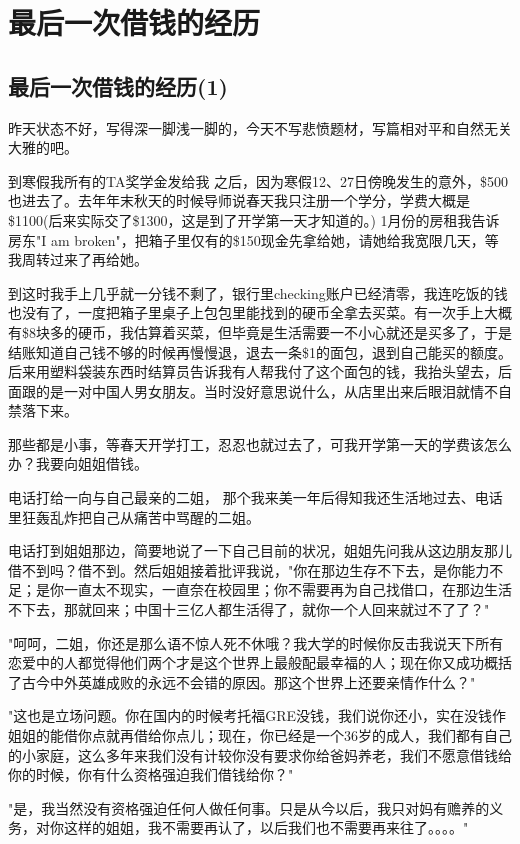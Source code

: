 \documentclass[12pt]{book}
\begin{document}
\chapter{最后一次借钱的经历}
\label{sec-33}
\section{最后一次借钱的经历(1)}
\label{sec-33-1}
昨天状态不好，写得深一脚浅一脚的，今天不写悲愤题材，写篇相对平和自然无关大雅的吧。

到寒假我所有的TA奖学金发给我 之后，因为寒假12、27日傍晚发生的意外，\$500也进去了。去年年末秋天的时候导师说春天我只注册一个学分，学费大概是\$1100(后来实际交了\$1300，这是到了开学第一天才知道的。) 1月份的房租我告诉房东"I am broken"，把箱子里仅有的\$150现金先拿给她，请她给我宽限几天，等我周转过来了再给她。

到这时我手上几乎就一分钱不剩了，银行里checking账户已经清零，我连吃饭的钱也没有了，一度把箱子里桌子上包包里能找到的硬币全拿去买菜。有一次手上大概有\$8块多的硬币，我估算着买菜，但毕竟是生活需要一不小心就还是买多了，于是结账知道自己钱不够的时候再慢慢退，退去一条\$1的面包，退到自己能买的额度。后来用塑料袋装东西时结算员告诉我有人帮我付了这个面包的钱，我抬头望去，后面跟的是一对中国人男女朋友。当时没好意思说什么，从店里出来后眼泪就情不自禁落下来。

那些都是小事，等春天开学打工，忍忍也就过去了，可我开学第一天的学费该怎么办？我要向姐姐借钱。

电话打给一向与自己最亲的二姐， 那个我来美一年后得知我还生活地过去、电话里狂轰乱炸把自己从痛苦中骂醒的二姐。

电话打到姐姐那边，简要地说了一下自己目前的状况，姐姐先问我从这边朋友那儿借不到吗？借不到。然后姐姐接着批评我说，"你在那边生存不下去，是你能力不足；是你一直太不现实，一直奈在校园里；你不需要再为自己找借口，在那边生活不下去，那就回来；中国十三亿人都生活得了，就你一个人回来就过不了了？"

"呵呵，二姐，你还是那么语不惊人死不休哦？我大学的时候你反击我说天下所有恋爱中的人都觉得他们两个才是这个世界上最般配最幸福的人；现在你又成功概括了古今中外英雄成败的永远不会错的原因。那这个世界上还要亲情作什么？"

"这也是立场问题。你在国内的时候考托福GRE没钱，我们说你还小，实在没钱作姐姐的能借你点就再借给你点儿；现在，你已经是一个36岁的成人，我们都有自己的小家庭，这么多年来我们没有计较你没有要求你给爸妈养老，我们不愿意借钱给你的时候，你有什么资格强迫我们借钱给你？"

"是，我当然没有资格强迫任何人做任何事。只是从今以后，我只对妈有赡养的义务，对你这样的姐姐，我不需要再认了，以后我们也不需要再来往了。。。。"
\end{document}
